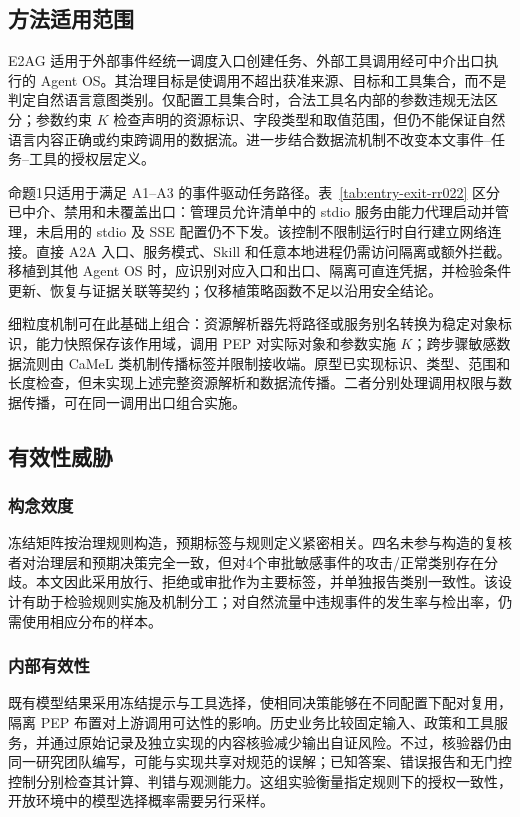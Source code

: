 \subsection{方法适用范围}

E2AG 适用于外部事件经统一调度入口创建任务、外部工具调用经可中介出口执行的 Agent OS。其治理目标是使调用不超出获准来源、目标和工具集合，而不是判定自然语言意图类别。仅配置工具集合时，合法工具名内部的参数违规无法区分；参数约束 $K$ 检查声明的资源标识、字段类型和取值范围，但仍不能保证自然语言内容正确或约束跨调用的数据流。进一步结合数据流机制不改变本文事件--任务--工具的授权层定义。

命题1只适用于满足 A1--A3 的事件驱动任务路径。表~\ref{tab:entry-exit-rr022} 区分已中介、禁用和未覆盖出口：管理员允许清单中的 stdio 服务由能力代理启动并管理，未启用的 stdio 及 SSE 配置仍不下发。该控制不限制运行时自行建立网络连接。直接 A2A 入口、服务模式、Skill 和任意本地进程仍需访问隔离或额外拦截。移植到其他 Agent OS 时，应识别对应入口和出口、隔离可直连凭据，并检验条件更新、恢复与证据关联等契约；仅移植策略函数不足以沿用安全结论。

细粒度机制可在此基础上组合：资源解析器先将路径或服务别名转换为稳定对象标识，能力快照保存该作用域，调用 PEP 对实际对象和参数实施 $K$；跨步骤敏感数据流则由 CaMeL 类机制传播标签并限制接收端。原型已实现标识、类型、范围和长度检查，但未实现上述完整资源解析和数据流传播。二者分别处理调用权限与数据传播，可在同一调用出口组合实施。

\subsection{有效性威胁}

\subsubsection{构念效度}

冻结矩阵按治理规则构造，预期标签与规则定义紧密相关。四名未参与构造的复核者对治理层和预期决策完全一致，但对4个审批敏感事件的攻击/正常类别存在分歧。本文因此采用放行、拒绝或审批作为主要标签，并单独报告类别一致性。该设计有助于检验规则实施及机制分工；对自然流量中违规事件的发生率与检出率，仍需使用相应分布的样本。

\subsubsection{内部有效性}

既有模型结果采用冻结提示与工具选择，使相同决策能够在不同配置下配对复用，隔离 PEP 布置对上游调用可达性的影响。历史业务比较固定输入、政策和工具服务，并通过原始记录及独立实现的内容核验减少输出自证风险。不过，核验器仍由同一研究团队编写，可能与实现共享对规范的误解；已知答案、错误报告和无门控控制分别检查其计算、判错与观测能力。这组实验衡量指定规则下的授权一致性，开放环境中的模型选择概率需要另行采样。


